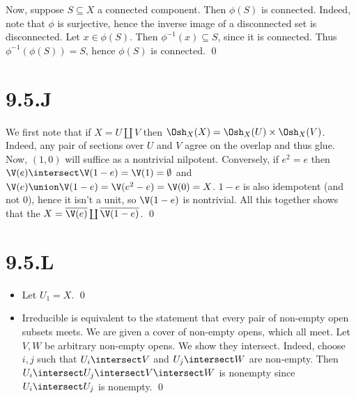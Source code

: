\documentclass{article}
\begin{document}
Now, suppose $S \subseteq X$ a connected component. Then
$\phi(S)$ is connected. Indeed, note that $\phi$
is surjective, hence the inverse image of a disconnected set is disconnected.
Let $x \in \phi(S)$. Then $\phi^{-1}(x) \subseteq S$, since it is
connected. Thus $\phi^{-1}(\phi(S)) = S$, hence $\phi(S)$ is
connected. \qed

\section{9.5.J}
We first note that if $X=U \coprod V$ then $\Osh_X(X)=\Osh_X(U) \times \Osh_X(V)$.
Indeed, any pair of sections over $U$ and
$V$ agree on the overlap and thus glue. Now,
$(1,0)$ will suffice as a nontrivial nilpotent. Conversely, if
$e^2=e$ then $\V(e) \intersect \V(1-e)
    =\V(1)= \emptyset$ and
$\V(e) \union
    \V(1-e)=\V(e^2-e)=\V(0)=X$. $1-e$ is also idempotent (and not
0), hence it isn't a unit, so $\V(1-e)$ is nontrivial. All this
together shows that the $X=\overline{\V(e)} \coprod \overline{\V(1-e)}$. \qed

\section{9.5.L}
\begin{itemize}
    \item[$\implies$] Let $U_1=X$. \qed
    \item[$\impliedby$] Irreducible is equivalent to the statement that every
          pair of non-empty open subsets meets. We are given a cover of non-empty opens,
          which all meet. Let $V, W$ be arbitrary non-empty opens. We
          show they intersect. Indeed, choose $i, j$ such that
          $U_i \intersect V$ and $U_j \intersect W$ are non-empty. Then
          $U_i \intersect U_j \intersect V \intersect W$ is nonempty since $U_i \intersect U_j$ is nonempty.
          \qed
\end{itemize}
\end{document}
